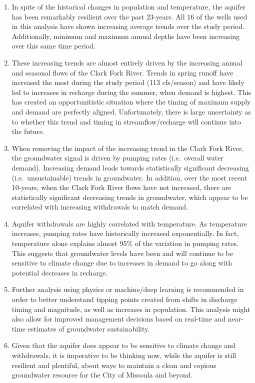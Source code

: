 \documentclass[a4paper, 12pt]{report}
\begin{document}
\begin{enumerate}
\item
  In spite of the historical changes in population and temperature, the
  aquifer has been remarkably resilient over the past 23-years. All 16
  of the wells used in this analysis have shown increasing average
  trends over the study period. Additionally, minimum and maximum annual
  depths have been increasing over this same time period.\\
\item
  These increasing trends are almost entirely driven by the increasing
  annual and seasonal flows of the Clark Fork River. Trends in spring
  runoff have increased the most during the study period (113
  cfs/season) and have likely led to increases in recharge during the
  summer, when demand is highest. This has created an opportunitistic
  situation where the timing of maximum supply and demand are perfectly
  aligned. Unfortunately, there is large uncertainty as to whether this
  trend and timing in streamflow/recharge will continue into the
  future.\\
\item
  When removing the impact of the increasing trend in the Clark Fork
  River, the groundwater signal is driven by pumping rates (i.e.~overall
  water demand). Increasing demand leads towards statistically
  significant decreasing (i.e.~unsustainable) trends in groundwater. In
  addition, over the most recent 10-years, when the Clark Fork River
  flows have not increased, there are statistically significant
  decreasing trends in groundwater, which appear to be correlated with
  increasing withdrawals to match demand.\\
\item
  Aquifer withdrawals are highly correlated with temperature. As
  temperature increases, pumping rates have historically increased
  exponentially. In fact, temperature alone explains almost 95\% of the
  variation in pumping rates. This suggests that groundwater levels have
  been and will continue to be sensitive to climate change due to
  increases in demand to go along with potential decreases in recharge.\\
\item
  Further analysis using physics or machine/deep learning is recommended
  in order to better understand tipping points created from shifts in
  discharge timing and magnitude, as well as increases in population.
  This analysis might also allow for improved management decisions based
  on real-time and near-time estimates of groundwater sustainability.\\
\item
  Given that the aquifer does appear to be sensitive to climate change
  and withdrawals, it is imperative to be thinking now, while the
  aquifer is still resilient and plentiful, about ways to maintain a
  clean and copious groundwater resource for the City of Missoula and
  beyond.
\end{enumerate}
\end{document}
